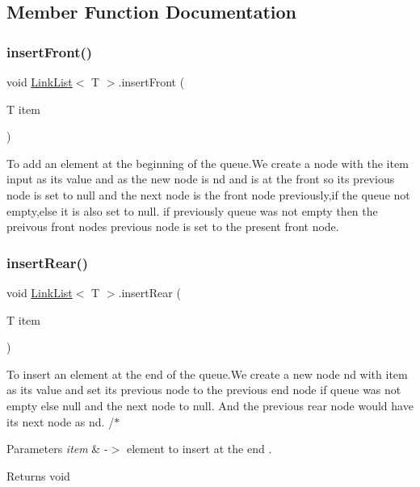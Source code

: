 \subsection{Member Function Documentation}
\mbox{\label{classLinkList_a38b2e77462f2733bc9254c3fd86b453f}} 
\subsubsection{\texorpdfstring{insert\+Front()}{insertFront()}}
{\footnotesize\ttfamily void \hyperlink{classLinkList}{Link\+List}$<$ T $>$.insert\+Front (\begin{DoxyParamCaption}\item[{T}]{item }\end{DoxyParamCaption})\hspace{0.3cm}{\ttfamily [inline]}}

To add an element at the beginning of the queue.\+We create a node with the \textquotesingle{}item\textquotesingle{} input as its value and as the new node is nd and is at the front so its previous node is set to null and the next node is the front node previously,if the queue not empty,else it is also set to null. if previously queue was not empty then the preivous front node\textquotesingle{}s previous node is set to the present front node. \mbox{\label{classLinkList_af0f013b563ae0abaec5c22037ec31e28}} 
\subsubsection{\texorpdfstring{insert\+Rear()}{insertRear()}}
{\footnotesize\ttfamily void \hyperlink{classLinkList}{Link\+List}$<$ T $>$.insert\+Rear (\begin{DoxyParamCaption}\item[{T}]{item }\end{DoxyParamCaption})\hspace{0.3cm}{\ttfamily [inline]}}

To insert an element at the end of the queue.\+We create a new node nd with item as its value and set its previous node to the previous end node if queue was not empty else null and the next node to null. And the previous rear node would have its next node as nd. /$\ast$ 
\begin{DoxyParams}{Parameters}
{\em item} & -\/$>$ element to insert at the end . \\
\hline
\end{DoxyParams}
\begin{DoxyReturn}{Returns}
void 
\end{DoxyReturn}
\mbox{\label{classLinkList_a62eb2e6bd32c8bdaa9bd26b5cef6c2c8}} 
